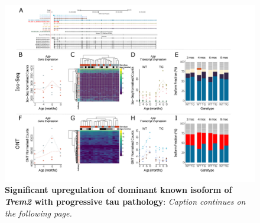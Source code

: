  
\begin{landscape}
	\begin{figure}[htp]
		\begin{center}
			\includegraphics[page=19,trim={0 0.5cm 0 1.5cm},scale =0.85]{Figures/TargetGene_DifferentialAnalysis.pdf}
		\end{center}
		\captionsetup{width=1.5\textwidth}
		\caption[Differential Isoform Expression: Changes in transcript expression of isoforms associated with \textit{Trem2}]%
		{\textbf{Significant upregulation of dominant known isoform of \textit{Trem2} with progressive tau pathology}: \textit{Caption continues on the following page.}}   
		\label{fig:trem2_diff_analysis}
	\end{figure}
\begin{figure}[p]
	\captionsetup{width=1.5\textwidth}
\end{figure}
\end{landscape}

